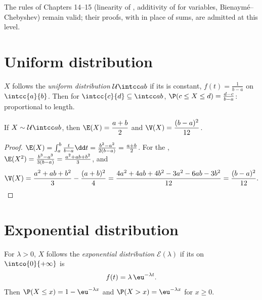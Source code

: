 The rules of Chapters 14--15 (linearity of , additivity of
 for  variables, Bienaymé--Chebyshev) remain valid;
their proofs, with  in place of sums, are admitted at this level.

\section{Uniform distribution}

\begin{definition}\label{def:g12:contdist:uniform}
$X$ follows the \emph{uniform distribution}
$\mathcal U\intcc ab$ if its  is constant,
$f(t) = \frac{1}{b-a}$ on $\intcc{a}{b}$. Then for
$\intcc{c}{d} \subseteq \intcc ab$,
$\P(c \leq X \leq d) = \frac{d - c}{b - a}$:  proportional to
length.
\end{definition}

\begin{proposition}\label{prop:g12:contdist:uniformmoments}
If $X \sim \mathcal U\intcc ab$, then
$\E(X) = \dfrac{a+b}{2}$ and $\V(X) = \dfrac{(b-a)^2}{12}$.
\end{proposition}

\begin{proof}
$\E(X) = \int_a^b \frac{t}{b-a}\dd t
= \frac{b^2 - a^2}{2(b-a)} = \frac{a+b}{2}$. For the ,
$\E(X^2) = \frac{b^3 - a^3}{3(b-a)} = \frac{a^2 + ab + b^2}{3}$, and
\[
\V(X) = \frac{a^2 + ab + b^2}{3} - \frac{(a+b)^2}{4}
= \frac{4a^2 + 4ab + 4b^2 - 3a^2 - 6ab - 3b^2}{12}
= \frac{(b - a)^2}{12}. \qedhere
\]
\end{proof}

\section{Exponential distribution}

\begin{definition}\label{def:g12:contdist:expo}
For $\lambda > 0$, $X$ follows the \emph{exponential
distribution} $\mathcal E(\lambda)$ if its
 on $\intco{0}{+\infty}$ is
\[
f(t) = \lambda\,\eu^{-\lambda t}.
\]
Then $\P(X \leq x) = 1 - \eu^{-\lambda x}$ and
$\P(X > x) = \eu^{-\lambda x}$ for $x \geq 0$.
\end{definition}

